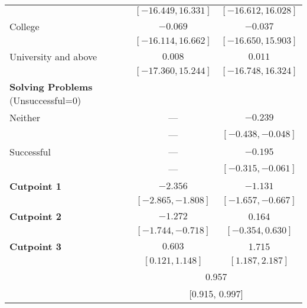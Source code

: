 \documentclass[12pt]{beamer}
\begin{document}
\begin{center}
{\begin{longtable}{l | cc}
           & $[-16.449, 16.331]$   & $[-16.612, 16.028]$      \\  
College          & $-0.069$                & $-0.037$         \\
           & $[-16.114, 16.662]$   & $[-16.650, 15.903]$    \\  
University and above  & $0.008$        & $0.011$         \\
          & $[-17.360, 15.244]$   & $[-16.748, 16.324]$    \\  
\textbf{Solving Problems} (Unsuccessful=0)   &               &            \\
Neither         & ---                & $-0.239$               \\
            & ---   & $[-0.438, -0.048]$     \\
Successful   & ---                & $-0.195$                  \\
           & ---   & $[-0.315, -0.061]$    \\
\hline
\textbf{Cutpoint 1}  & $-2.356$                & $-1.131$          \\
          & $[-2.865, -1.808]$   & $[-1.657, -0.667]$       \\
\textbf{Cutpoint 2}  & $-1.272$                & 0.164          \\
          & $[-1.744, -0.718]$   & $[-0.354, 0.630]$       \\
\textbf{Cutpoint 3}  & $0.603$                & 1.715          \\
          & $[0.121, 1.148]$   & $[1.187, 2.187]$       \\
\hline
\bm{$\rho$}           & \multicolumn{2}{c}{0.957}              \\
                      & \multicolumn{2}{c}{[0.915, 0.997]} 
\label{table6}
\end{longtable}
}
\endgroup
\end{center}
\end{document}
